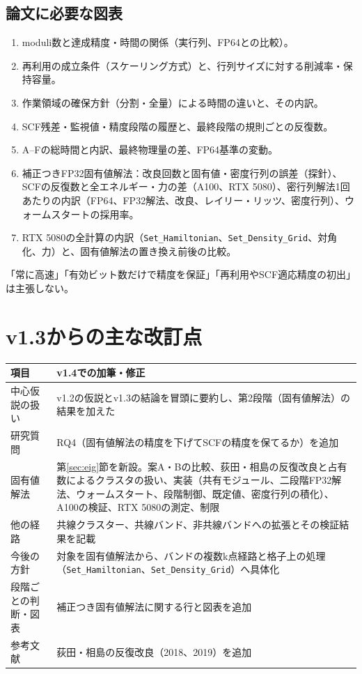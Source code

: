 \documentclass[a4paper,11pt]{ltjsarticle}
\newcommand{\code}[1]{\texttt{#1}}
\begin{document}
\subsection{論文に必要な図表}
\begin{enumerate}
\item moduli数と達成精度・時間の関係（実行列、FP64との比較）。
\item 再利用の成立条件（スケーリング方式）と、行列サイズに対する削減率・保持容量。
\item 作業領域の確保方針（分割・全量）による時間の違いと、その内訳。
\item SCF残差・監視値・精度段階の履歴と、最終段階の規則ごとの反復数。
\item A--Fの総時間と内訳、最終物理量の差、FP64基準の変動。
\item 補正つきFP32固有値解法：改良回数と固有値・密度行列の誤差（探針）、SCFの反復数と全エネルギー・力の差（A100、RTX 5080）、密行列解法1回あたりの内訳（FP64、FP32解法、改良、レイリー・リッツ、密度行列）、ウォームスタートの採用率。
\item RTX 5080の全計算の内訳（\code{Set\_Hamiltonian}、\code{Set\_Density\_Grid}、対角化、力）と、固有値解法の置き換え前後の比較。
\end{enumerate}
「常に高速」「有効ビット数だけで精度を保証」「再利用やSCF適応精度の初出」は主張しない。

\section{v1.3からの主な改訂点}\label{sec:changes}
\noindent\begin{tabularx}{\linewidth}{@{}p{34mm}Y@{}}
\toprule
項目 & v1.4での加筆・修正\\
\midrule
中心仮説の扱い & v1.2の仮説とv1.3の結論を冒頭に要約し、第2段階（固有値解法）の結果を加えた\\
研究質問 & RQ4（固有値解法の精度を下げてSCFの精度を保てるか）を追加\\
固有値解法 & 第\ref{sec:eig}節を新設。案A・Bの比較、荻田・相島の反復改良と占有数によるクラスタの扱い、実装（共有モジュール、二段階FP32解法、ウォームスタート、段階制御、既定値、密度行列の積化）、A100の検証、RTX 5080の測定、制限\\
他の経路 & 共線クラスター、共線バンド、非共線バンドへの拡張とその検証結果を記載\\
今後の方針 & 対象を固有値解法から、バンドの複数k点経路と格子上の処理（\code{Set\_Hamiltonian}、\code{Set\_Density\_Grid}）へ具体化\\
段階ごとの判断・図表 & 補正つき固有値解法に関する行と図表を追加\\
参考文献 & 荻田・相島の反復改良（2018、2019）を追加\\
\bottomrule
\end{tabularx}
\end{document}
